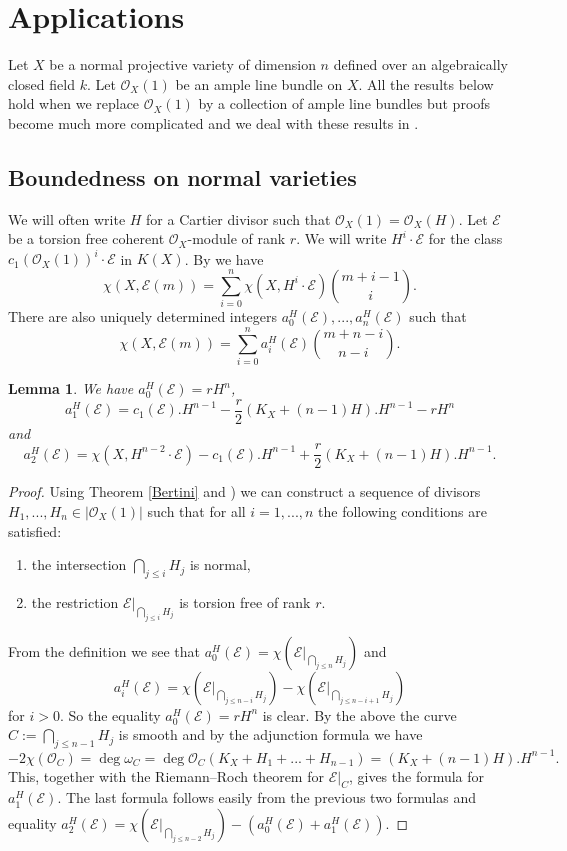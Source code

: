 \documentclass[twoside, 11pt]{article}
\theoremstyle{plain}
\newtheorem{Lemma}[Thm]{\sc Lemma}
\theoremstyle{definition}
\theoremstyle{remark}
\newcommand{\cE}{{\mathcal E}}
\newcommand{\cO}{{\mathcal O}}
\begin{document}
\section{Applications}


Let $X$ be a normal projective variety of dimension $n$ defined over an algebraically closed field $k$.
Let $\cO_X (1)$ be an ample line bundle on $X$.  All the results below hold when we replace $\cO_X(1)$ by a collection of ample line bundles
but proofs become much more complicated and we deal with these results in \cite{La4}.

\medskip

\subsection{Boundedness on normal varieties}

We will often write $H$ for a Cartier divisor such that $\cO_X (1)=\cO_X(H)$. 
Let $\cE$ be a torsion free coherent  $\cO_X$-module of rank $r$. 
We will  write $H^{i}\cdot \cE $ for the class $c_1 (\cO_X(1) )^{i}\cdot \cE $ in $K(X)$.
By \cite[Chapter VI, Theorem 2.13]{Ko}
 we have
$$\chi (X, \cE (m))= \sum _{i=0}^n \chi (X, H^{i}\cdot \cE  )\binom{m+i-1}{i}.$$
There are also uniquely determined integers $a_0^H(\cE),..., a_n^H (\cE)$ such that
$$\chi (X, \cE (m))= \sum _{i=0}^n a_i^H(\cE)\binom{m+n-i}{n-i}.$$


\begin{Lemma}\label{formula-for-a_2}
We have
 $a_0^H(\cE)=rH^n$,
$$a_1^H(\cE)= c_1(\cE).H^{n-1}-\frac{r}{2}(K_X+(n-1)H).H^{n-1}-rH^n$$
and
$$a_2^H(\cE)=\chi (X, H^{n-2}\cdot  \cE )-c_1(\cE).H^{n-1}+\frac{r}{2}(K_X+(n-1)H).H^{n-1}.$$
\end{Lemma}

\begin{proof}
Using  Theorem \ref{Bertini} and  \cite[Lemma 1.1.12 and Corollary 1.1.14]{HL}) we can construct a sequence  of divisors $H_1,..., H_n\in |\cO_X (1)|$ such that for all $i=1,...,n$ the following conditions are satisfied:
\begin{enumerate}
\item the intersection  $\bigcap _{j\le i} H_j $ is normal,
\item the restriction $\cE |_{\bigcap _{j\le i} H_j }$ is torsion free of rank $r$. 
\end{enumerate}
From the definition we see that
$a_0 ^H(\cE)= \chi (\cE |_{\bigcap _{j\le n} H_j} )$
and
$$a_i ^H(\cE)= \chi (\cE |_{\bigcap _{j\le n-i} H_j} )- \chi (\cE |_{\bigcap _{j\le n-i+1} H_j} )$$
for $i>0$.  So the equality  $a_0^H(\cE)=rH^n$ is clear.  
By the above the curve $C:={\bigcap _{j\le n-1} H_j} $ is smooth and by the adjunction formula we have 
$$-2\chi (\cO_C)=\deg \omega _C=\deg \cO_C(K_X+H_1+...+H_{n-1})=(K_X+(n-1)H).H^{n-1}.$$
This, together with the Riemann--Roch theorem for $\cE |_C$, gives the formula for  $a_1^H(\cE)$.
 The last formula follows easily from the previous two formulas and equality 
 $a_2 ^H(\cE)= \chi (\cE |_{\bigcap _{j\le n-2} H_j} )- (a_0^H(\cE)+a_1^H(\cE))$.
\end{proof}
\end{document}
